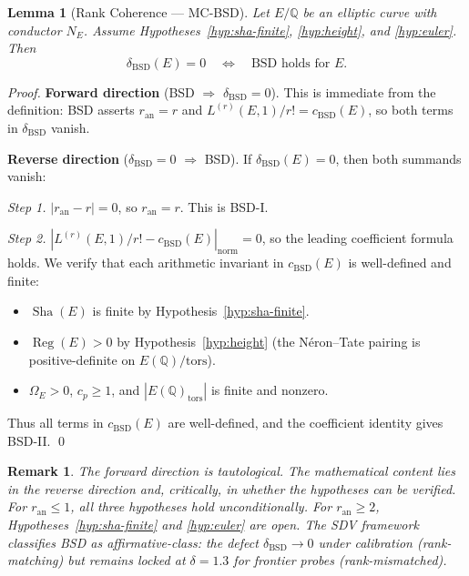 \documentclass[11pt]{article}
\newtheorem{lemma}[theorem]{Lemma}
\newtheorem{remark}[theorem]{Remark}
\DeclareMathOperator{\Reg}{Reg}
\DeclareMathOperator{\Sha}{Sha}
\begin{document}
\begin{lemma}[Rank Coherence --- MC-BSD]
\label{lem:MC-BSD}
Let $E/\mathbb{Q}$ be an elliptic curve with conductor $N_E$.  Assume
Hypotheses~\ref{hyp:sha-finite}, \ref{hyp:height}, and \ref{hyp:euler}.  Then
\[
  \delta_{\mathrm{BSD}}(E) = 0
  \quad \Longleftrightarrow \quad
  \text{BSD holds for } E.
\]
\end{lemma}

\begin{proof}
\textbf{Forward direction} (BSD $\Rightarrow$ $\delta_{\mathrm{BSD}} = 0$).
This is immediate from the definition: BSD asserts $r_{\mathrm{an}} = r$ and
$L^{(r)}(E,1)/r! = c_{\mathrm{BSD}}(E)$, so both terms in
$\delta_{\mathrm{BSD}}$ vanish.

\textbf{Reverse direction} ($\delta_{\mathrm{BSD}} = 0$ $\Rightarrow$ BSD).
If $\delta_{\mathrm{BSD}}(E) = 0$, then both summands vanish:

\emph{Step 1.} $|r_{\mathrm{an}} - r| = 0$, so $r_{\mathrm{an}} = r$.  This
is BSD-I.

\emph{Step 2.} $|L^{(r)}(E,1)/r! - c_{\mathrm{BSD}}(E)|_{\mathrm{norm}} = 0$,
so the leading coefficient formula holds.  We verify that each arithmetic
invariant in $c_{\mathrm{BSD}}(E)$ is well-defined and finite:

\begin{itemize}
  \item $\Sha(E)$ is finite by Hypothesis~\ref{hyp:sha-finite}.
  \item $\Reg(E) > 0$ by Hypothesis~\ref{hyp:height} (the N\'eron--Tate pairing
    is positive-definite on $E(\mathbb{Q})/\mathrm{tors}$).
  \item $\Omega_E > 0$, $c_p \geq 1$, and $|E(\mathbb{Q})_{\mathrm{tors}}|$ is
    finite and nonzero.
\end{itemize}

Thus all terms in $c_{\mathrm{BSD}}(E)$ are well-defined, and the coefficient
identity gives BSD-II. \qed
\end{proof}

\begin{remark}
The forward direction is tautological.  The mathematical content lies in the
reverse direction and, critically, in whether the hypotheses can be verified.
For $r_{\mathrm{an}} \leq 1$, all three hypotheses hold unconditionally.  For
$r_{\mathrm{an}} \geq 2$, Hypotheses~\ref{hyp:sha-finite} and \ref{hyp:euler}
are open.  The SDV framework classifies BSD as affirmative-class: the defect
$\delta_{\mathrm{BSD}} \to 0$ under calibration (rank-matching) but remains
locked at $\delta = 1.3$ for frontier probes (rank-mismatched).
\end{remark}
\end{document}
